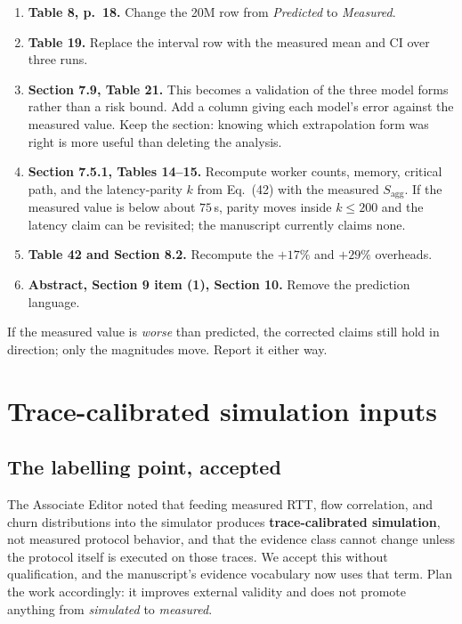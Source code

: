 \documentclass[11pt,a4paper]{article}
\begin{document}
\begin{enumerate}[leftmargin=*,itemsep=3pt]
  \item \textbf{Table 8, p.~18.} Change the 20M row from \emph{Predicted} to
  \emph{Measured}.
  \item \textbf{Table 19.} Replace the interval row with the measured mean and
  CI over three runs.
  \item \textbf{Section 7.9, Table 21.} This becomes a validation of the three
  model forms rather than a risk bound. Add a column giving each model's error
  against the measured value. Keep the section: knowing which extrapolation
  form was right is more useful than deleting the analysis.
  \item \textbf{Section 7.5.1, Tables 14--15.} Recompute worker counts, memory,
  critical path, and the latency-parity $k$ from Eq.~(42) with the measured
  $S_{\mathrm{agg}}$. If the measured value is below about $75$\,s, parity moves
  inside $k\leq200$ and the latency claim can be revisited; the manuscript
  currently claims none.
  \item \textbf{Table 42 and Section 8.2.} Recompute the $+17\%$ and $+29\%$
  overheads.
  \item \textbf{Abstract, Section 9 item (1), Section 10.} Remove the
  prediction language.
\end{enumerate}

If the measured value is \emph{worse} than predicted, the corrected claims
still hold in direction; only the magnitudes move. Report it either way.

\section{Trace-calibrated simulation inputs}
\label{sec:todo-traces}

\subsection*{The labelling point, accepted}

The Associate Editor noted that feeding measured RTT, flow correlation, and
churn distributions into the simulator produces \textbf{trace-calibrated
simulation}, not measured protocol behavior, and that the evidence class cannot
change unless the protocol itself is executed on those traces. We accept this
without qualification, and the manuscript's evidence vocabulary now uses that
term. Plan the work accordingly: it improves external validity and does not
promote anything from \emph{simulated} to \emph{measured}.
\end{document}
